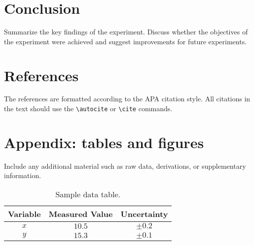 \documentclass[a4paper,12pt]{article}
\begin{document}
\section{Conclusion}
\label{sec:conclusion}
Summarize the key findings of the experiment. Discuss whether the objectives of the experiment were achieved and suggest improvements for future experiments.

\section{References}
\label{sec:references}
The references are formatted according to the APA citation style. All citations in the text should use the \texttt{\textbackslash autocite} or \texttt{\textbackslash cite} commands.

\printbibliography %

\newpage
\appendix
\section{Appendix: tables and figures}
\label{sec:appendix}
Include any additional material such as raw data, derivations, or supplementary information.

\begin{table}[H]
    \centering
    \begin{tabular}{|c|c|c|}
        \hline
        Variable & Measured Value & Uncertainty \\ 
        \hline
        $x$ & $10.5$ & $\pm0.2$ \\ 
        $y$ & $15.3$ & $\pm0.1$ \\ 
        \hline
    \end{tabular}
    \caption{Sample data table.}
    \label{tab:example_table}
\end{table}
\end{document}
